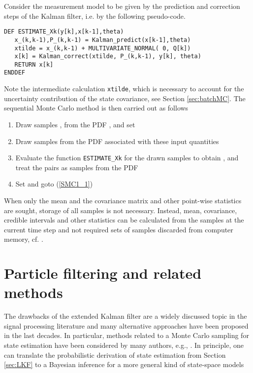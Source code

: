 \documentclass[10pt]{article}
\begin{document}
\begin{spacing}{1}
Consider the measurement model to be given by the prediction and correction steps of the Kalman filter, i.e. by the following pseudo-code.
\begin{verbatim}
DEF ESTIMATE_Xk(y[k],x[k-1],theta)
   x_(k,k-1),P_(k,k-1) = Kalman_predict(x[k-1],theta)
   xtilde = x_(k,k-1) + MULTIVARIATE_NORMAL( 0, Q[k])
   x[k] = Kalman_correct(xtilde, P_(k,k-1), y[k], theta)
   RETURN x[k]
ENDDEF
\end{verbatim}
Note the intermediate calculation \verb!xtilde!, which is necessary to account for the uncertainty contribution of the state covariance, see Section \ref{sec:batchMC}. 
The sequential Monte Carlo method is then carried out as follows
\begin{enumerate}
  \item Draw  samples , 
	from the PDF , and set 
	\label{SMC1}
	\item Draw  samples  from the PDF associated with these input quantities \label{SMC1_1}
\item Evaluate the function \verb!ESTIMATE_Xk! for the drawn samples to obtain  \label{SMC2}, and treat the pairs  as samples from
	the PDF 
	\item Set  and goto (\ref{SMC1_1})
 \end{enumerate}
  

When only the mean  and the covariance matrix  and other point-wise statistics are sought, storage of all samples  is not necessary. Instead, mean, covariance, credible intervals and other statistics can be calculated from the samples at the current time step and not required sets of samples discarded from computer memory, cf. \cite{Eichstadt2012}.



\section{Particle filtering and related methods}
\label{sec:Particle}
The drawbacks of the extended Kalman filter are a widely discussed topic in the signal processing literature and many alternative approaches have been proposed in the last decades. In particular, methods related to a Monte Carlo sampling for state estimation have been considered by many authors, e.g., \cite{Garcia:2013kq, Douc:2005, Wang:2007ik, Montazeri:2010il}.
In principle, one can translate the probabilistic derivation of state estimation from Section \ref{sec:LKF} to a Bayesian inference for a more general kind of state-space models~\cite{Candy}


\end{spacing}
\end{document}
